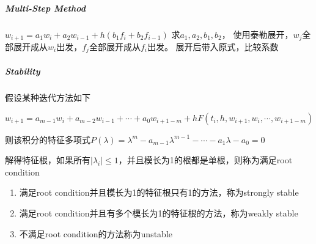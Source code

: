 \documentclass[]{article}
\let\oldsubparagraph\subparagraph
\renewcommand{\subparagraph}[1]{\oldsubparagraph{#1}\mbox{}}
\begin{document}
\begin{multicols}{3}
\subparagraph{Multi-Step Method}\label{header-c121}

\(w_{i+1}=a_1 w_i + a_2 w_{i-1} + h(b_1 f_i + b_2 f_{i-1})\)
求\(a_1, a_2, b_1, b_2\)，
使用泰勒展开，\(w_j\)全部展开成从\(w_i\)出发，\(f_j\)全部展开成从\(f_i\)出发。
展开后带入原式，比较系数


\subparagraph{Stability}\label{header-c135}

假设某种迭代方法如下

\(w_{i+1}=a_{m-1}w_i+a_{m-2}w_{i-1}+\cdots+a_0w_{i+1-m}+hF(t_i,h,w_{i+1},w_i,\cdots,w_{i+1-m})\)

则该积分的特征多项式\(P(\lambda)=\lambda^m-a_{m-1}\lambda^{m-1}-\cdots-a_1\lambda-a_0=0\)

解得特征根，如果所有\(|\lambda_i|\leq1\)，并且模长为1的根都是单根，则称为满足root
condition

\begin{enumerate}
\def\labelenumi{\arabic{enumi}.}
\item
  满足root condition并且模长为1的特征根只有1的方法，称为strongly stable
\item
  满足root condition并且有多个模长为1的特征根的方法，称为weakly stable
\item
  不满足root condition的方法称为unstable
\end{enumerate}
\end{multicols}
\end{document}

